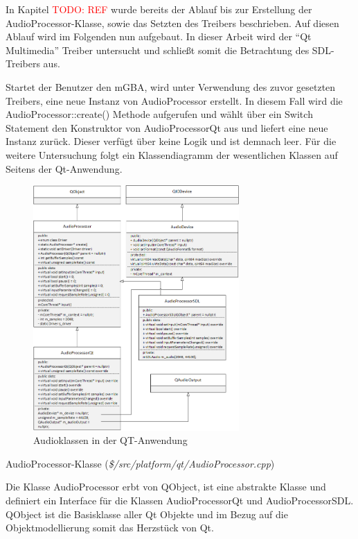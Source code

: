 \documentclass[11pt,a4paper]{scrartcl}
\begin{document}
In Kapitel  \textcolor{red}{ TODO: REF} wurde bereits der Ablauf bis zur Erstellung der AudioProcessor-Klasse, sowie das Setzten des Treibers beschrieben. Auf diesen Ablauf wird im Folgenden nun aufgebaut. In dieser Arbeit
wird der "`Qt Multimedia"' Treiber untersucht und schlie{\ss}t somit die Betrachtung des SDL-Treibers aus.

Startet der Benutzer den mGBA, wird unter Verwendung des zuvor gesetzten Treibers, eine neue Instanz von AudioProcessor erstellt. In diesem Fall wird die AudioProcessor::create() Methode aufgerufen und w\"ahlt \"uber ein Switch Statement den Konstruktor von AudioProcessorQt aus und liefert eine neue Instanz zur\"uck. Dieser verf\"ugt \"uber keine Logik und ist demnach leer. F\"ur die weitere Untersuchung folgt ein Klassendiagramm der wesentlichen Klassen auf Seitens der Qt-Anwendung.

\begin{figure}[h!]
    \centering
    \includegraphics[width=0.7\textwidth]{QT_Klassendiagramm}
    \caption{Audioklassen in der QT-Anwendung}
    \label{fig:qtclassdiagramm}
\end{figure}

\newpage

\vspace{5mm}
\large AudioProcessor-Klasse \normalsize(\textit{\$/src/platform/qt/AudioProcessor.cpp})
\vspace{2mm}\newline

Die Klasse AudioProcessor erbt von QObject, ist eine abstrakte Klasse und definiert ein Interface f\"ur die Klassen AudioProcessorQt und AudioProcessorSDL. QObject ist die Basisklasse aller Qt Objekte und im Bezug auf
die Objektmodellierung somit das Herzst\"uck von Qt. 
\end{document}

